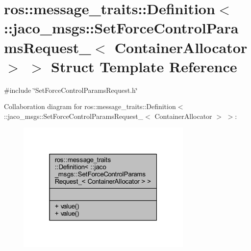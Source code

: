 \hypertarget{structros_1_1message__traits_1_1Definition_3_01_1_1jaco__msgs_1_1SetForceControlParamsRequest___c59584efc00e1eca7e3af5d8ad03eba5}{}\section{ros\+:\+:message\+\_\+traits\+:\+:Definition$<$ \+:\+:jaco\+\_\+msgs\+:\+:Set\+Force\+Control\+Params\+Request\+\_\+$<$ Container\+Allocator $>$ $>$ Struct Template Reference}
\label{structros_1_1message__traits_1_1Definition_3_01_1_1jaco__msgs_1_1SetForceControlParamsRequest___c59584efc00e1eca7e3af5d8ad03eba5}


{\ttfamily \#include \char`\"{}Set\+Force\+Control\+Params\+Request.\+h\char`\"{}}



Collaboration diagram for ros\+:\+:message\+\_\+traits\+:\+:Definition$<$ \+:\+:jaco\+\_\+msgs\+:\+:Set\+Force\+Control\+Params\+Request\+\_\+$<$ Container\+Allocator $>$ $>$\+:
\nopagebreak
\begin{figure}[H]
\begin{center}
\leavevmode
\includegraphics[width=244pt]{d0/d8a/structros_1_1message__traits_1_1Definition_3_01_1_1jaco__msgs_1_1SetForceControlParamsRequest___0de87042e7e529ad1b16e0cc672afea7}
\end{center}
\end{figure}
